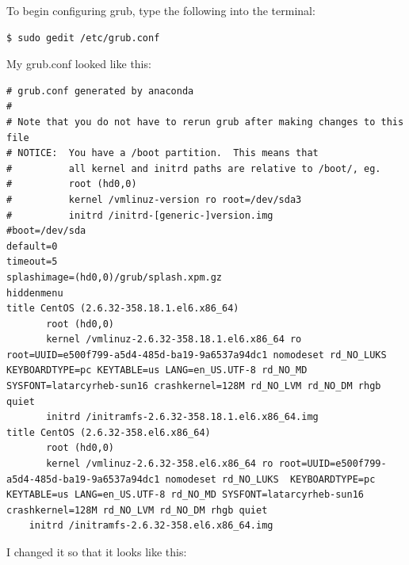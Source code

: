 To begin configuring grub, type the following into the terminal:
\begin{snugshade}\begin{verbatim}
$ sudo gedit /etc/grub.conf
\end{verbatim}\end{snugshade}\noindent
My grub.conf looked like this: 
\begin{snugshade}\begin{lstlisting}
# grub.conf generated by anaconda
#
# Note that you do not have to rerun grub after making changes to this file
# NOTICE:  You have a /boot partition.  This means that
#          all kernel and initrd paths are relative to /boot/, eg.
#          root (hd0,0)
#          kernel /vmlinuz-version ro root=/dev/sda3
#          initrd /initrd-[generic-]version.img
#boot=/dev/sda
default=0
timeout=5
splashimage=(hd0,0)/grub/splash.xpm.gz
hiddenmenu
title CentOS (2.6.32-358.18.1.el6.x86_64)
       root (hd0,0)
       kernel /vmlinuz-2.6.32-358.18.1.el6.x86_64 ro root=UUID=e500f799-a5d4-485d-ba19-9a6537a94dc1 nomodeset rd_NO_LUKS  KEYBOARDTYPE=pc KEYTABLE=us LANG=en_US.UTF-8 rd_NO_MD SYSFONT=latarcyrheb-sun16 crashkernel=128M rd_NO_LVM rd_NO_DM rhgb quiet
       initrd /initramfs-2.6.32-358.18.1.el6.x86_64.img
title CentOS (2.6.32-358.el6.x86_64)
       root (hd0,0)
       kernel /vmlinuz-2.6.32-358.el6.x86_64 ro root=UUID=e500f799-a5d4-485d-ba19-9a6537a94dc1 nomodeset rd_NO_LUKS  KEYBOARDTYPE=pc KEYTABLE=us LANG=en_US.UTF-8 rd_NO_MD SYSFONT=latarcyrheb-sun16 crashkernel=128M rd_NO_LVM rd_NO_DM rhgb quiet
	initrd /initramfs-2.6.32-358.el6.x86_64.img
\end{lstlisting}\end{snugshade}\noindent
I changed it so that it looks like this: 
